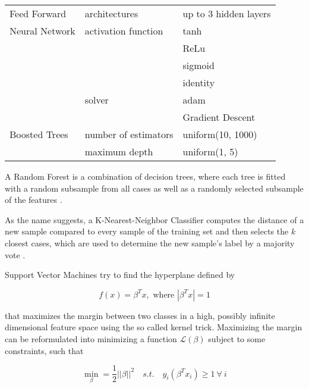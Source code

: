 \begin{table}
\begin{tabular}{lll}
Feed Forward                & architectures               & up to 3 hidden layers                  \\
Neural Network              & activation function         & tanh \\
                            &                             & ReLu \\ 
                            &                             & sigmoid \\
                            &                             & identity       \\
                            & solver                      & adam \\
                            &                             & Gradient Descent     \\
Boosted Trees               & number of estimators        & uniform(10, 1000)                      \\
                            & maximum depth               & uniform(1, 5)                         \\
\bottomrule
\end{tabular}
\end{table}

A Random Forest is a combination of decision trees, where each tree is fitted with a random subsample from all cases as well as a randomly selected subsample of the features \cite{rf01}.

As the name suggests, a K-Nearest-Neighbor Classifier computes the distance of a new sample compared to every sample of the training set and then selects the $k$ closest cases, which are used to determine the new sample's label by a majority vote \cite{knn}.

Support Vector Machines try to find the hyperplane defined by

\begin{equation*}
f(x) = \beta^T x, \text{ where } |\beta^T x| = 1
\end{equation*}

that maximizes the margin between two classes in a high, possibly infinite dimensional feature space using the so called kernel trick. Maximizing the margin can be reformulated into minimizing a function $\mathcal{L}(\beta)$ subject to some constraints, such that

\begin{equation*}
\min_{\beta} = \frac{1}{2} ||\beta||^2 \quad s.t. \quad y_i (\beta^T x_i) \geq 1\ \forall\ i
\end{equation*}

